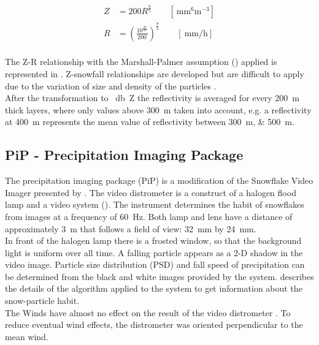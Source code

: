 \begin{align}
	Z & = 200 R^{\frac{8}{5}} \qquad [\SI{}{\mm^6\metre^{-3}} ] \nonumber \\ 
	R & = \left( \frac{ 10^{\frac{Ze}{10}} }{200} \right)^{\frac{8}{5}} \qquad [ \SI{}{\mm\per\hour} ]
	\label{eq:Z-R}
\end{align}
\\
The Z-R relationship with the Marshall-Palmer assumption () applied is represented in . Z-snowfall relationships are developed but are difficult to apply due to the variation of size and density of the particles \citep{lecuyer_aos_2017}. \\
After the transformation to \SI{}{\decibel Z} the reflectivity is averaged for every \SI{200}{\metre} thick layers, where only values above \SI{300}{\metre} taken into account, e.g. a reflectivity at \SI{400}{\metre} represents the mean value of reflectivity between \SIlist{300;500}{\metre}. 


\newpage
\subsection{PiP - Precipitation Imaging Package}

The precipitation imaging package (PiP) is a modification of the Snowflake Video Imager presented by \citet{newman_presenting_2009}. The video distrometer is a construct of a halogen flood lamp and a video system (). The instrument determines the habit of snowflakes from images at a frequency of \SI{60}{\Hz}. Both lamp and lens have a distance of approximately \SI{3}{\metre} that follows a field of view: \SI{32}{\mm} by \SI{24}{\mm}. 
\\
In front of the halogen lamp there is a frosted window, so that the background light is uniform over all time. A falling particle appears as a 2-D shadow in the video image. 
Particle size distribution (PSD) and fall speed of precipitation can be determined from the black and white images provided by the system.
\citet{newman_presenting_2009} describes the details of the algorithm applied to the system to get information about the snow-particle habit. \\
The Winds have almost no effect on the result of the video distrometer \citep{newman_presenting_2009}. To reduce eventual wind effects, the distrometer was oriented perpendicular to the mean wind.
\newpage
